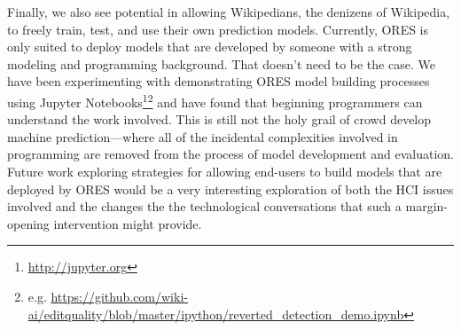 Finally, we also see potential in allowing Wikipedians, the denizens of Wikipedia, to freely train, test, and use their own prediction models.  Currently, ORES is only suited to deploy models that are developed by someone with a strong modeling and programming background.  That doesn't need to be the case.  We have been experimenting with demonstrating ORES model building processes using Jupyter Notebooks\footnote{\url{http://jupyter.org}}\footnote{e.g. \url{ https://github.com/wiki-ai/editquality/blob/master/ipython/reverted_detection_demo.ipynb}} and have found that beginning programmers can understand the work involved.  This is still not the holy grail of crowd develop machine prediction---where all of the incidental complexities involved in programming are removed from the process of model development and evaluation.  Future work exploring strategies for allowing end-users to build models that are deployed by ORES would be a very interesting exploration of both the HCI issues involved and the changes the the technological conversations that such a margin-opening intervention might provide.
